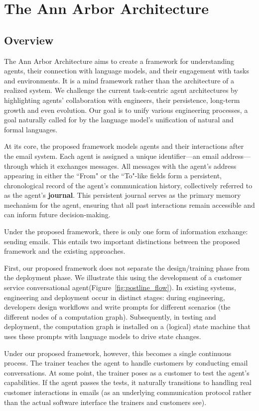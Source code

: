 \section{The Ann Arbor Architecture}
\subsection{Overview}

The Ann Arbor Architecture aims to create a framework for understanding agents, their connection with language models, and their engagement with tasks and environments.
It is a mind framework rather than the architecture of a realized system.
We challenge the current task-centric agent architectures by highlighting agents' collaboration with engineers, their persistence, long-term growth and even evolution.  
Our goal is to unify various engineering processes, a goal naturally called for by the language model's unification of natural and formal languages.

At its core, the proposed framework models agents and their interactions after the email system. Each agent is assigned a unique identifier—an email address—through which it exchanges messages. All messages with the agent's address  appearing in either the ``From" or the ``To"-like fields form a persistent, chronological record of the agent’s communication history, collectively referred to as the agent’s {\bf journal}. This persistent journal serves as the primary memory mechanism for the agent, ensuring that all past interactions remain accessible and can inform future decision-making.

Under the proposed framework, there is only one form of information exchange: sending emails.  This entails two important distinctions between the proposed framework and the existing approaches.

First, our proposed framework does not separate the design/training phase from the deployment phase. We illustrate this using the development of a customer service conversational agent(Figure~\ref{fig:postline_flow}). In existing systems, engineering and deployment occur in distinct stages: during engineering, developers design workflows and write prompts for different scenarios (the different nodes of a computation graph). Subsequently, in testing and deployment, the computation graph is installed on a (logical) state machine that uses these prompts with language models to drive state changes.

Under our proposed framework, however, this becomes a single continuous process. The trainer teaches the agent to handle customers by conducting email conversations. At some point, the trainer poses as a customer to test the agent’s capabilities. If the agent passes the tests, it naturally transitions to handling real customer interactions in emails (as an underlying communication protocol rather than the actual software interface the trainers and customers see).

